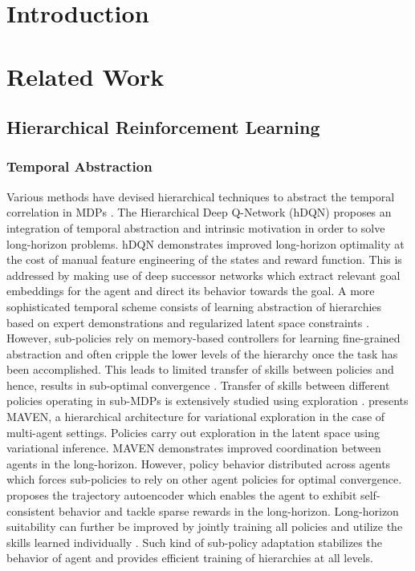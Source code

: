 \documentclass{article}
\begin{document}
\section{Introduction}

\section{Related Work}

\subsection{Hierarchical Reinforcement Learning}
\subsubsection{Temporal Abstraction}
Various methods have devised hierarchical techniques to abstract the temporal correlation in MDPs \cite{hdqn,dsn,temp,sutton}. The Hierarchical Deep Q-Network (hDQN) \cite{hdqn} proposes an integration of temporal abstraction and intrinsic motivation in order to solve long-horizon problems. hDQN demonstrates improved long-horizon optimality at the cost of manual feature engineering of the states and reward function. This is addressed by making use of deep successor networks \cite{dsn} which extract relevant goal embeddings for the agent and direct its behavior towards the goal. A more sophisticated temporal scheme consists of learning abstraction of hierarchies based on expert demonstrations and regularized latent space constraints \cite{learningtemp}. However, sub-policies rely on memory-based controllers for learning fine-grained abstraction and often cripple the lower levels of the hierarchy once the task has been accomplished. This leads to limited transfer of skills between policies and hence, results in sub-optimal convergence \cite{stochastic}. Transfer of skills between different policies operating in sub-MDPs is extensively studied using exploration \cite{utility}. \cite{maven} presents MAVEN, a hierarchical architecture for variational exploration in the case of multi-agent settings. Policies carry out exploration in the latent space using variational inference. MAVEN demonstrates improved coordination between agents in the long-horizon. However, policy behavior distributed across agents which forces sub-policies to rely on other agent policies for optimal convergence. \cite{self} proposes the trajectory autoencoder which enables the agent to exhibit self-consistent behavior and tackle sparse rewards in the long-horizon. Long-horizon suitability can further be improved by jointly training all policies and utilize the skills learned individually \cite{hippo}. Such kind of sub-policy adaptation stabilizes the behavior of agent and provides efficient training of hierarchies at all levels.\\
\end{document}
